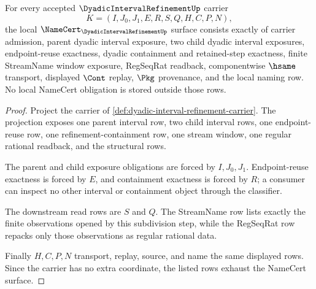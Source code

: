 \begin{theorem}
\label{thm:dyadic-interval-refinement-namecert-obligations}
For every accepted $\DyadicIntervalRefinementUp$ carrier
$$
K=(I,J_0,J_1,E,R,S,Q,H,C,P,N),
$$
the local $\NameCert_{\DyadicIntervalRefinementUp}$ surface consists exactly of carrier admission, parent dyadic interval exposure, two child dyadic interval exposures, endpoint-reuse exactness, dyadic containment and retained-step exactness, finite StreamName window exposure, RegSeqRat readback, componentwise $\hsame$ transport, displayed $\Cont$ replay, $\Pkg$ provenance, and the local naming row. No local NameCert obligation is stored outside those rows.
\end{theorem}
\begin{proof}
Project the carrier of \autoref{def:dyadic-interval-refinement-carrier}. The projection exposes one parent interval row, two child interval rows, one endpoint-reuse row, one refinement-containment row, one stream window, one regular rational readback, and the structural rows.

The parent and child exposure obligations are forced by $I,J_0,J_1$. Endpoint-reuse exactness is forced by $E$, and containment exactness is forced by $R$; a consumer can inspect no other interval or containment object through the classifier.

The downstream read rows are $S$ and $Q$. The StreamName row lists exactly the finite observations opened by this subdivision step, while the RegSeqRat row repacks only those observations as regular rational data.

Finally $H,C,P,N$ transport, replay, source, and name the same displayed rows. Since the carrier has no extra coordinate, the listed rows exhaust the NameCert surface.
\end{proof}

